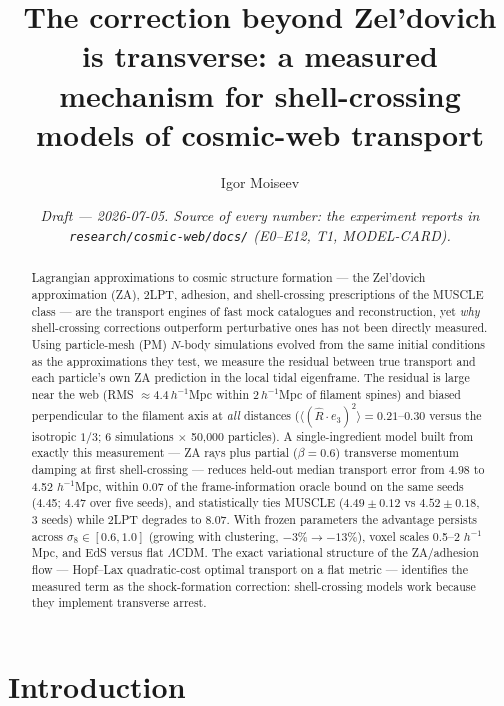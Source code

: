 \documentclass[11pt]{article}
\title{The correction beyond Zel'dovich is transverse: a measured mechanism for shell-crossing models of cosmic-web transport}
\author{Igor Moiseev}
\date{\normalsize\itshape Draft --- 2026-07-05. Source of every number: the experiment reports in \normalfont\texttt{research/cosmic-web/docs/} \itshape (E0--E12, T1, MODEL-CARD).}
\begin{document}
\maketitle

\begin{abstract}
Lagrangian approximations to cosmic structure formation --- the Zel'dovich approximation (ZA), 2LPT, adhesion, and shell-crossing prescriptions of the MUSCLE class --- are the transport engines of fast mock catalogues and reconstruction, yet \emph{why} shell-crossing corrections outperform perturbative ones has not been directly measured. Using particle-mesh (PM) $N$-body simulations evolved from the same initial conditions as the approximations they test, we measure the residual between true transport and each particle's own ZA prediction in the local tidal eigenframe. The residual is large near the web (RMS $\approx 4.4\,h^{-1}$Mpc within $2\,h^{-1}$Mpc of filament spines) and biased perpendicular to the filament axis at \emph{all} distances ($\langle(\hat{R}\cdot e_3)^2\rangle = 0.21$--$0.30$ versus the isotropic $1/3$; 6 simulations $\times$ 50,000 particles). A single-ingredient model built from exactly this measurement --- ZA rays plus partial ($\beta = 0.6$) transverse momentum damping at first shell-crossing --- reduces held-out median transport error from 4.98 to 4.52 $h^{-1}$Mpc, within 0.07 of the frame-information oracle bound on the same seeds (4.45; 4.47 over five seeds), and statistically ties MUSCLE ($4.49 \pm 0.12$ vs $4.52 \pm 0.18$, 3 seeds) while 2LPT degrades to 8.07. With frozen parameters the advantage persists across $\sigma_8 \in [0.6, 1.0]$ (growing with clustering, $-3\% \rightarrow -13\%$), voxel scales 0.5--2 $h^{-1}$Mpc, and EdS versus flat $\Lambda$CDM. The exact variational structure of the ZA/adhesion flow --- Hopf--Lax quadratic-cost optimal transport on a flat metric --- identifies the measured term as the shock-formation correction: shell-crossing models work because they implement transverse arrest.
\end{abstract}

\section{Introduction}
\label{sec:intro}
\end{document}
